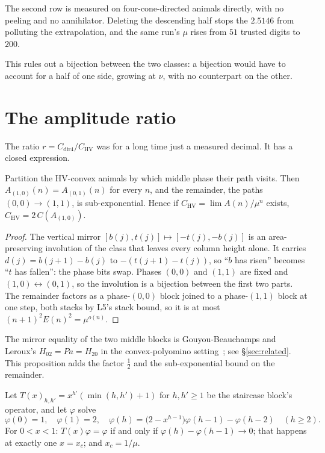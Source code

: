 \documentclass[11pt]{article}
\newcommand{\HV}{\mathrm{HV}}
\begin{document}
The second row is measured on four-cone-directed animals directly, with no
peeling and no annihilator. Deleting the descending half stops the $2.5146$ from
polluting the extrapolation, and the same run's $\mu$ rises from $51$ trusted
digits to $200$.

This rules out a bijection between the two classes: a bijection would have to
account for a half of one side, growing at $\nu$, with no counterpart on the
other.

\section{The amplitude ratio}
\label{sec:amplitude}

The ratio $r = C_{\text{dir4}}/C_{\HV}$ was for a long time just a measured
decimal. It has a closed expression.

\begin{proposition}
\label{prop:mirror}
Partition the HV-convex animals by which middle phase their path visits. Then
$A_{(1,0)}(n) = A_{(0,1)}(n)$ for every $n$, and the remainder, the paths
$(0,0)\to(1,1)$, is sub-exponential. Hence if $C_{\HV} = \lim A(n)/\mu^n$
exists, $C_{\HV} = 2\,C(A_{(1,0)})$.
\end{proposition}

\begin{proof}
The vertical mirror $[b(j),t(j)] \mapsto [-t(j),-b(j)]$ is an area-preserving
involution of the class that leaves every column height alone. It carries
$d(j) = b(j{+}1)-b(j)$ to $-(t(j{+}1)-t(j))$, so ``$b$ has risen'' becomes
``$t$ has fallen'': the phase bits swap. Phases $(0,0)$ and $(1,1)$ are fixed
and $(1,0)\leftrightarrow(0,1)$, so the involution is a bijection between the
first two parts. The remainder factors as a phase-$(0,0)$ block joined to a
phase-$(1,1)$ block at one step, both stacks by L5's stack bound, so it is
at most $(n{+}1)^2E(n)^2 = \mu^{o(n)}$.
\end{proof}

\begin{remark}[attribution --- 1 of 2]
\label{rem:attr2}
The mirror equality of the two middle blocks is Gouyou-Beauchamps and Leroux's
$H_{02} = Pa = H_{20}$ in the convex-polyomino setting~\cite{gblRoux2004}; see
\S\ref{sec:related}. This proposition adds the factor
$\tfrac12$ and the sub-exponential bound on the remainder.
\end{remark}

\begin{proposition}
\label{prop:phi}
Let $T(x)_{h,h'} = x^{h'}(\min(h,h')+1)$ for $h,h' \ge 1$ be the staircase
block's operator, and let $\varphi$ solve
\[
  \varphi(0) = 1, \quad \varphi(1) = 2, \quad
  \varphi(h) = \bigl(2 - x^{h-1}\bigr)\varphi(h{-}1) - \varphi(h{-}2)
  \quad (h \ge 2).
\]
For $0 < x < 1$: $T(x)\varphi = \varphi$ if and only if
$\varphi(h) - \varphi(h{-}1) \to 0$; that happens at exactly one $x = x_c$; and
$x_c = 1/\mu$.
\end{proposition}
\end{document}
